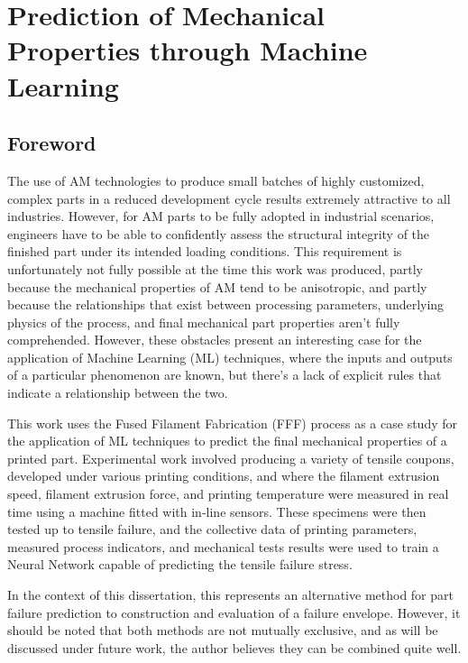 \documentclass[main.tex]{subfiles}
\begin{document}
\chapter{Prediction of Mechanical Properties through Machine Learning} \label{ch:ml}

\section{Foreword} \label{sec:fw_ml}

The use of AM technologies to produce small batches of highly customized, complex parts in a reduced development cycle results extremely attractive to all industries. However, for AM parts to be fully adopted in industrial scenarios, engineers have to be able to confidently assess the structural integrity of the finished part under its intended loading conditions. This requirement is unfortunately not fully possible at the time this work was produced, partly because the mechanical properties of AM tend to be anisotropic, and partly because the relationships that exist between processing parameters, underlying physics of the process, and final mechanical part properties aren't fully comprehended. However, these obstacles present an interesting case for the application of Machine Learning (ML) techniques, where the inputs and outputs of a particular phenomenon are known, but there's a lack of explicit rules that indicate a relationship between the two. 

This work uses the Fused Filament Fabrication (FFF) process as a case study for the application of ML techniques to predict the final mechanical properties of a printed part. Experimental work involved producing a variety of tensile coupons, developed under various printing conditions, and where the filament extrusion speed, filament extrusion force, and printing temperature were measured in real time using a machine fitted with in-line sensors. These specimens were then tested up to tensile failure, and the collective data of printing parameters, measured process indicators, and mechanical tests results were used to train a Neural Network capable of predicting the tensile failure stress.

In the context of this dissertation, this represents an alternative method for part failure prediction to construction and evaluation of a failure envelope. However, it should be noted that both methods are not mutually exclusive, and as will be discussed under future work, the author believes they can be combined quite well. 
\end{document}
